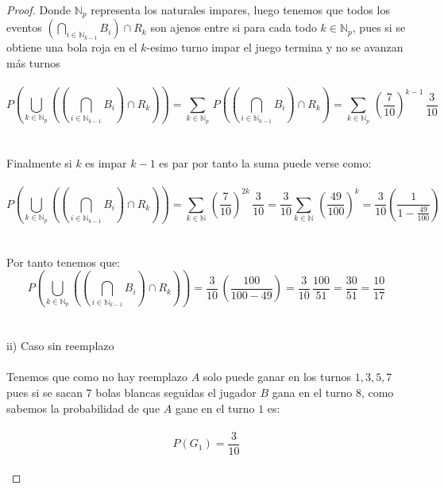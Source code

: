 \documentclass[11pt,letterpaper]{article}
\newcommand{\N}{\mathbb{N}}
\begin{document}
\begin{proof}
    Donde $\N_p$ representa los naturales impares, luego tenemos que todos los eventos $\displaystyle\left(\bigcap_{i\in \N_{k-1}}B_i\right)\cap R_k$ son ajenos entre si para cada todo $k\in \N_p$, pues si se obtiene una bola roja en el $k$-esimo turno impar el juego termina y no se avanzan más turnos\,\\
    \,\\
    \begin{equation*}
        P\left(\bigcup_{k\in \N_p}\left(\left(\bigcap_{i\in \N_{k-1}}B_i\right)\cap R_k\right) \right)=\sum_{k\in \N_p}\,P\left(\left(\bigcap_{i\in \N_{k-1}}B_i\right)\cap R_k\right)=\sum_{k\in \N_p}\,\left(\frac{7}{10}\right)^{k-1}\,\frac{3}{10}
    \end{equation*}\,\\
    \,\\
    Finalmente si $k$ es impar $k-1$ es par por tanto la suma puede verse como:\,\\
    \,\\
    \begin{equation*}
     P\left(\bigcup_{k\in \N_p}\left(\left(\bigcap_{i\in \N_{k-1}}B_i\right)\cap R_k\right) \right)=\sum_{k\in \N}\,\left(\frac{7}{10}\right)^{2k}\,\frac{3}{10}=\frac{3}{10}\sum_{k\in \N}\,\left(\frac{49}{100}\right)^k=\frac{3}{10}\left(\frac{1}{1-\frac{49}{100}}\right)
    \end{equation*}\,\\
    \,\\
    Por tanto tenemos que:\,\\
    \begin{equation*}
      P\left(\bigcup_{k\in \N_p}\left(\left(\bigcap_{i\in \N_{k-1}}B_i\right)\cap R_k\right) \right)=\frac{3}{10}\,\left(\frac{100}{100-49}\right)=\frac{3}{10}\,\frac{100}{51}=\frac{30}{51}=\frac{10}{17}  
    \end{equation*}\,\\
    \,\\
    ii)\,\,Caso sin reemplazo\,\\
    \,\\
    Tenemos que como no hay reemplazo $A$ solo puede ganar en los turnos $1,3,5,7$ pues si se sacan $7$ bolas blancas seguidas el jugador $B$ gana en el turno $8$, como sabemos la probabilidad de que $A$ gane en el turno $1$ es:\,\\
    \,\\
    \begin{equation*}
        P(G_1)=\frac{3}{10}
    \end{equation*}\,\\

\end{proof}
\end{document}
